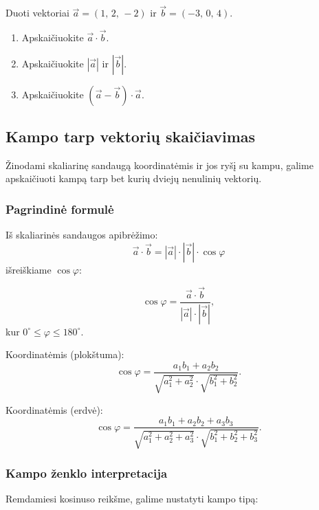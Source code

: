\begin{exercise}
Duoti vektoriai $\vec{a} = (1,\, 2,\, -2)$ ir $\vec{b} = (-3,\, 0,\, 4)$.
\begin{enumerate}[label=\alph*)]
    \item Apskaičiuokite $\vec{a} \cdot \vec{b}$.
    \item Apskaičiuokite $|\vec{a}|$ ir $|\vec{b}|$.
    \item Apskaičiuokite $(\vec{a} - \vec{b}) \cdot \vec{a}$.
\end{enumerate}
\end{exercise}

\subsection{Kampo tarp vektorių skaičiavimas}

Žinodami skaliarinę sandaugą koordinatėmis ir jos ryšį su kampu, galime apskaičiuoti kampą tarp bet kurių dviejų nenulinių vektorių.

\subsubsection*{Pagrindinė formulė}

Iš skaliarinės sandaugos apibrėžimo:
\[
\vec{a} \cdot \vec{b} = |\vec{a}| \cdot |\vec{b}| \cdot \cos\varphi
\]
išreiškiame $\cos\varphi$:

\begin{tcolorbox}[colback=blue!5!white, colframe=blue!60!black, title=Kampo tarp vektorių formulė]
\[
\cos\varphi = \frac{\vec{a} \cdot \vec{b}}{|\vec{a}| \cdot |\vec{b}|},
\]
kur $0^\circ \leq \varphi \leq 180^\circ$.

Koordinatėmis (plokštuma):
\[
\cos\varphi = \frac{a_1 b_1 + a_2 b_2}{\sqrt{a_1^2 + a_2^2} \cdot \sqrt{b_1^2 + b_2^2}}.
\]

Koordinatėmis (erdvė):
\[
\cos\varphi = \frac{a_1 b_1 + a_2 b_2 + a_3 b_3}{\sqrt{a_1^2 + a_2^2 + a_3^2} \cdot \sqrt{b_1^2 + b_2^2 + b_3^2}}.
\]
\end{tcolorbox}

\subsubsection*{Kampo ženklo interpretacija}

Remdamiesi kosinuso reikšme, galime nustatyti kampo tipą:

